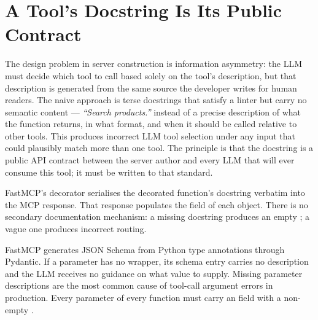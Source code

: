 \section{A Tool's Docstring Is Its Public Contract}
\label{sec:mcp-decorators}

The design problem in server construction is information asymmetry: the
LLM must decide which tool to call based solely on the tool's description,
but that description is generated from the same source the developer writes
for human readers. The naive approach is terse docstrings that satisfy a
linter but carry no semantic content --- \emph{``Search products.''} instead
of a precise description of what the function returns, in what format,
and when it should be called relative to other tools. This produces
incorrect LLM tool selection under any input that could plausibly match
more than one tool. The principle is that the docstring is a public API
contract between the server author and every LLM that will ever consume
this tool; it must be written to that standard.

FastMCP's  decorator serialises the decorated
function's docstring verbatim into the MCP  response.
That response populates the  field of each
 object. There is no secondary documentation mechanism:
a missing docstring produces an empty ; a vague one
produces incorrect routing.

\begin{warningbox}
FastMCP generates JSON Schema from Python type annotations through Pydantic.
If a parameter has no  wrapper,
its schema entry carries no description and the LLM receives no guidance on
what value to supply. Missing parameter descriptions are the most common
cause of tool-call argument errors in production.
Every parameter of every  function must carry an
 field with a non-empty .
\end{warningbox}

